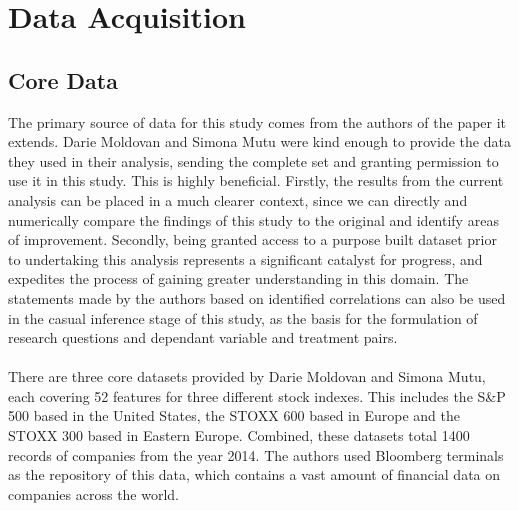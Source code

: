 \section{Data Acquisition}
\subsection{Core Data}
{The primary source of data for this study comes from the authors of the paper it extends. Darie Moldovan and Simona Mutu were kind enough to provide the data they used in their analysis, sending the complete set and granting permission to use it in this study. This is highly beneficial. Firstly, the results from the current analysis can be placed in a much clearer context, since we can directly and numerically compare the findings of this study to the original and identify areas of improvement. Secondly, being granted access to a purpose built dataset prior to undertaking this analysis represents a significant catalyst for progress, and expedites the process of gaining greater understanding in this domain. The statements made by the authors based on identified correlations can also be used in the casual inference stage of this study, as the basis for the formulation of research questions and dependant variable and treatment pairs.}\\\\
{There are three core datasets provided by Darie Moldovan and Simona Mutu, each covering 52 features for three different stock indexes. This includes the S\&P 500 based in the United States, the STOXX 600 based in Europe and the STOXX 300 based in Eastern Europe. Combined, these datasets total 1400 records of companies from the year 2014. The authors used Bloomberg terminals as the repository of this data, which contains a vast amount of financial data on companies across the world.}
